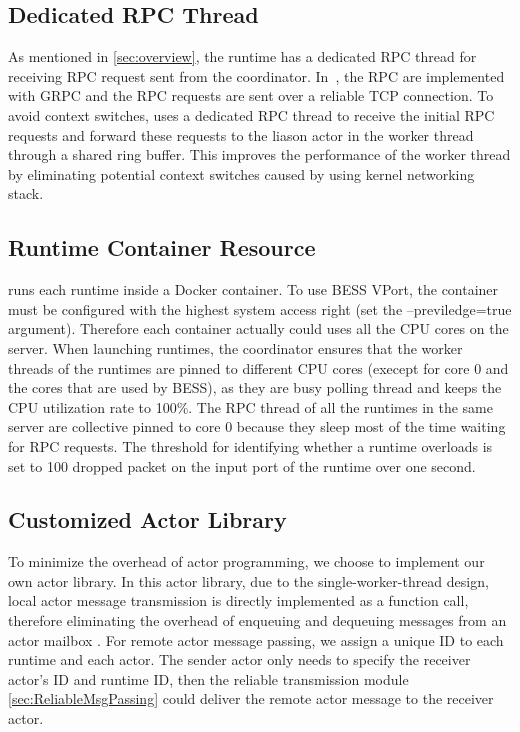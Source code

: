 

\subsection{Dedicated RPC Thread}
As mentioned in \ref{sec:overview}, the runtime has a dedicated RPC thread for receiving RPC request sent from the coordinator. In~\nfactor, the RPC are implemented with GRPC \cite{grpc} and the RPC requests are sent over a reliable TCP connection. To avoid context switches, \nfactor uses a dedicated RPC thread to receive the initial RPC requests and forward these requests to the liason actor in the worker thread through a shared ring buffer. This improves the performance of the worker thread by eliminating potential context switches caused by using kernel networking stack.

\subsection{Runtime Container Resource}

\nfactor runs each runtime inside a Docker \cite{docker} container. To use BESS VPort, the container must be configured with the highest system access right (set the --previledge=true argument). Therefore each container actually could uses all the CPU cores on the server. When launching runtimes, the coordinator ensures that the worker threads of the runtimes are pinned to different CPU cores (execept for core 0 and the cores that are used by BESS), as they are busy polling thread and keeps the CPU utilization rate to 100\%. The RPC thread of all the runtimes in the same server are collective pinned to core 0 because they sleep most of the time waiting for RPC requests. The threshold for identifying whether a runtime overloads is set to 100 dropped packet on the input port of the runtime over one second.

\subsection{Customized Actor Library}
\label{sec:actor-library}

To minimize the overhead of actor programming, we choose to implement our own actor library. In this actor library, due to the single-worker-thread design, local actor message transmission is directly implemented as a function call, therefore eliminating the overhead of enqueuing and dequeuing messages from an actor mailbox \cite{actor-wiki}. For remote actor message passing, we assign a unique ID to each runtime and each actor. The sender actor only needs to specify the receiver actor's ID and runtime ID, then the reliable transmission module \ref{sec:ReliableMsgPassing} could deliver the remote actor message to the receiver actor.

